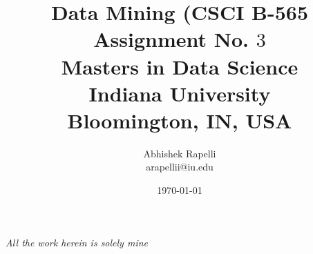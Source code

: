 \documentclass[12pt]{article}
\title{ Data Mining (CSCI B-565 \\
Assignment No. $3$ \\
Masters in Data Science \\Indiana University\\ Bloomington, IN, USA}
\author {Abhishek Rapelli \\ arapellii@iu.edu}
\date{\today}
\begin{document}
\maketitle
\begin{center}
\textit{All the work herein is solely mine}
\end{center}
\end{document}
